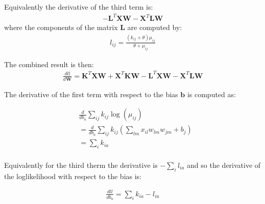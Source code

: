 \documentclass[11pt]{letter}
\newcommand{\matr}[1]{\mathbf{#1}}
\begin{document}
Equivalently the derivative of the third term is:
\begin{align*}
-\matr{L}^T \matr{X} \matr{W} - \matr{X}^T \matr{L} \matr{W}
\end{align*}
where the components of the matrix $\matr{L}$ are computed by:
\begin{align*}
l_{ij} = \frac{(k_{ij} + \theta) \mu_{ij}}{\theta + \mu_{ij}}   
\end{align*}

The combined result is then:
\begin{align*}
\frac{dll}{d\matr{W}} = \matr{K}^T \matr{X} \matr{W} + \matr{X}^T \matr{K} \matr{W} - 
\matr{L}^T \matr{X} \matr{W} - \matr{X}^T \matr{L} \matr{W}
\end{align*}


The derivative of the first term with respect to the bias $\matr{b}$ is computed as:

\begin{align*}
&\frac{d}{db_{a}}\sum_{ij} k_{ij} \log{(\mu_{ij})} \\
&= \frac{d}{db_{a}}\sum_{ij} k_{ij} (\sum_{lm} x_{il} w_{lm} w_{jm} + b_j) \\
&= \sum_{i} k_{ia}\\
\end{align*}

Equivalently for the third therm the derivative is $-\sum_{i} l_{ia}$ and so the derivative of the loglikelihood with respect to the bias is:

\begin{align*}
\frac{dll}{db_a} = \sum_{i} k_{ia} - l_{ia}\\
\end{align*}
\end{document}
